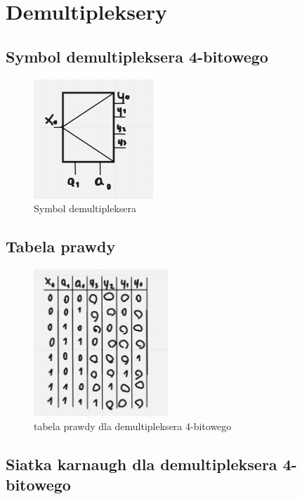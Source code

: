 \section{Demultipleksery}

\subsection{Symbol demultipleksera 4-bitowego}

\begin{figure}[h!]
    \centering
    \includegraphics[width=0.4\textwidth]{images/dmux/dmux_s.png}
    \caption{Symbol demultipleksera}
    \label{fig:my_label}
\end{figure}

\subsection{Tabela prawdy}

\begin{figure}[h!]
    \centering
    \includegraphics[width=0.45\textwidth]{images/dmux/dmux_t.png}
    \caption{tabela prawdy dla demultipleksera 4-bitowego}
    \label{fig:my_label}
\end{figure}

\newpage

\subsection{Siatka karnaugh dla demultipleksera 4-bitowego}

